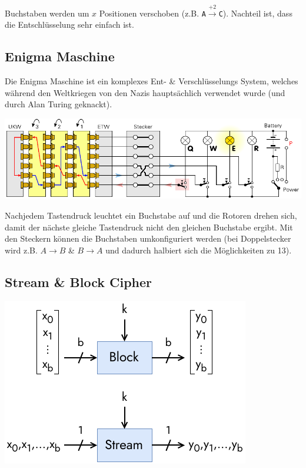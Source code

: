 \documentclass[
  10pt,
  a4paper,
]{article}
\begin{document}
\begin{multicols*}{2}
Buchstaben werden um \(x\) Positionen verschoben (z.B.
\texttt{A}\(\overset{+2}{\rightarrow}\)\texttt{C}). Nachteil ist, dass
die Entschlüsselung sehr einfach ist.

\subsection{\texorpdfstring{Enigma Maschine
\href{https://www.youtube.com/watch?v=ybkkiGtJmkM}{\color{BrickRed}\faYoutube}}{Enigma Maschine }}\label{enigma-maschine}

Die Enigma Maschine ist ein komplexes Ent- \& Verschlüsselungs System,
welches während den Weltkriegen von den Nazis hauptsächlich verwendet
wurde (und durch Alan Turing geknackt).

\includegraphics{images/crypto/enigma.pdf}

Nachjedem Tastendruck leuchtet ein Buchstabe auf und die Rotoren drehen
sich, damit der nächste gleiche Tastendruck nicht den gleichen Buchstabe
ergibt. Mit den Steckern können die Buchstaben umkonfiguriert werden
(bei Doppelstecker wird z.B. \(A\rightarrow B\) \& \(B\rightarrow A\)
und dadurch halbiert sich die Möglichkeiten zu 13).

\subsection{Stream \& Block Cipher}\label{stream-block-cipher}

\begin{center}
\includegraphics{images/crypto/block_stream_cipher.pdf}
\end{center}


\end{multicols*}
\end{document}
